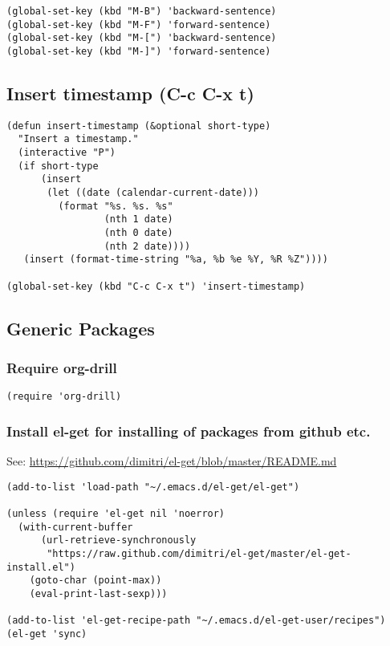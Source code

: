 \documentclass[nofonts]{tufte-handout}
\begin{document}
\begin{verbatim}
(global-set-key (kbd "M-B") 'backward-sentence)
(global-set-key (kbd "M-F") 'forward-sentence)
(global-set-key (kbd "M-[") 'backward-sentence)
(global-set-key (kbd "M-]") 'forward-sentence)
\end{verbatim}
\subsection{Insert timestamp (C-c C-x t)}
\label{sec-1-10}

\begin{verbatim}
(defun insert-timestamp (&optional short-type)
  "Insert a timestamp."
  (interactive "P")
  (if short-type
      (insert
       (let ((date (calendar-current-date)))
         (format "%s. %s. %s"
                 (nth 1 date)
                 (nth 0 date)
                 (nth 2 date))))
   (insert (format-time-string "%a, %b %e %Y, %R %Z"))))

(global-set-key (kbd "C-c C-x t") 'insert-timestamp)
\end{verbatim}
\subsection{Generic Packages}
\label{sec-1-11}
\subsubsection{Require org-drill}
\label{sec-1-11-1}
\begin{verbatim}
(require 'org-drill)
\end{verbatim}

\subsubsection{Install el-get for installing of packages from github etc.}
\label{sec-1-11-2}

See: \url{https://github.com/dimitri/el-get/blob/master/README.md}

\begin{verbatim}
(add-to-list 'load-path "~/.emacs.d/el-get/el-get")

(unless (require 'el-get nil 'noerror)
  (with-current-buffer
      (url-retrieve-synchronously
       "https://raw.github.com/dimitri/el-get/master/el-get-install.el")
    (goto-char (point-max))
    (eval-print-last-sexp)))

(add-to-list 'el-get-recipe-path "~/.emacs.d/el-get-user/recipes")
(el-get 'sync)
\end{verbatim}
\end{document}
